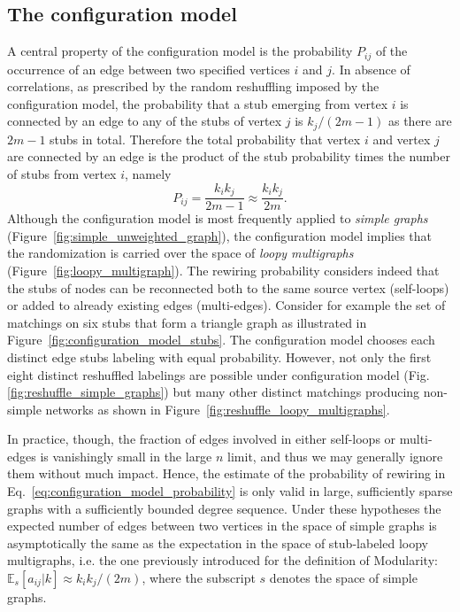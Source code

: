 \subsection{The configuration model}\label{sec:configuration_model}
A central property of the configuration model is the probability $P_{ij}$ of the occurrence of an edge between two specified vertices $i$ and $j$.
In absence of correlations, as prescribed by the random reshuffling imposed by the configuration model, the probability that a stub emerging from vertex $i$ is connected by an edge to any of the stubs of vertex $j$ is $k_j/(2m-1)$ as there are $2m-1$ stubs in total.
Therefore the total probability that vertex $i$ and vertex $j$ are connected by an edge is the product of the stub probability times the number of stubs from vertex $i$, namely 
\begin{equation}\label{eq:configuration_model_probability}
P_{ij} = \frac{k_i k_j}{2m-1} \approx \frac{k_i k_j}{2m}.
\end{equation}
Although the configuration model is most frequently applied to \emph{simple graphs} (Figure~\ref{fig:simple_unweighted_graph}), the configuration model implies that the randomization is carried over the space of \emph{loopy multigraphs} (Figure~\ref{fig:loopy_multigraph}).
The rewiring probability considers indeed that the stubs of nodes can be reconnected both to the same source vertex (self-loops) or added to already existing edges (multi-edges).
Consider for example the set of matchings on six stubs that form a triangle graph as illustrated in Figure~\ref{fig:configuration_model_stubs}. The configuration model chooses each distinct edge stubs labeling with equal probability. However, not only the first eight distinct reshuffled labelings are possible under configuration model (Fig.\ref{fig:reshuffle_simple_graphs}) but many other distinct matchings producing non-simple networks as shown in Figure~\ref{fig:reshuffle_loopy_multigraphs}.

In practice, though, the fraction of edges involved in either self-loops or multi-edges is vanishingly small in the large $n$ limit, and thus we may generally ignore them without much impact. 
Hence, the estimate of the probability of rewiring in Eq.~\ref{eq:configuration_model_probability} is only valid in large, sufficiently sparse graphs with a sufficiently bounded degree sequence.
Under these hypotheses the expected number of edges between two vertices in the space of simple graphs is asymptotically the same as the expectation in the space of stub-labeled loopy multigraphs, i.e. the one previously introduced for the definition of Modularity: $\mathbb{E}_s[a_{ij} |k] \approx k_i k_j /(2m)$, where the subscript $s$ denotes the space of simple graphs.

